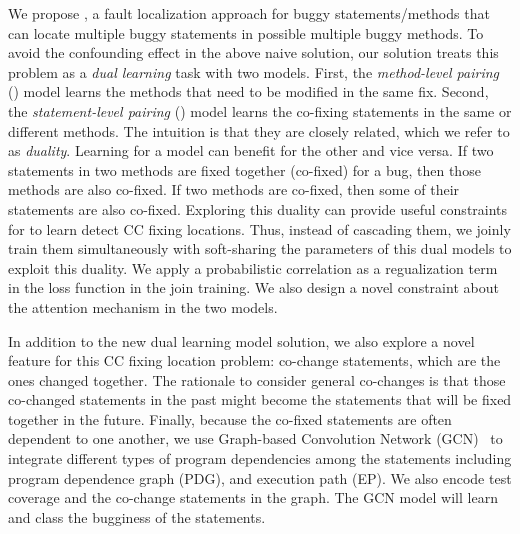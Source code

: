 We propose {\tool}, a fault localization approach for buggy
statements/methods that can locate multiple buggy statements in
possible multiple buggy methods. To avoid the confounding effect in
the above naive solution, our solution treats this problem as a {\em
  dual learning} task with two models. First, the {\em method-level
  pairing} () model learns the methods that need to be
modified in the same fix. Second, the {\em statement-level pairing}
() model learns the co-fixing statements in the same or
different methods. The intuition is that they are closely related,
which we refer to as {\em duality}. Learning for a model can benefit
for the other and vice versa. If two statements in two methods are
fixed together (co-fixed) for a bug, then those methods are also
co-fixed. If two methods are co-fixed, then some of their statements
are also co-fixed. Exploring this duality can provide useful
constraints for {\tool} to learn detect CC fixing locations. Thus,
instead of cascading them, we joinly train them simultaneously with
soft-sharing the parameters of this dual models to exploit this
duality. We apply a probabilistic correlation as a regualization term
in the loss function in the join training. We also design a novel
constraint about the attention mechanism in the two models.

In addition to the new dual learning model solution, we also explore a
novel feature for this CC fixing location problem: co-change
statements, which are the ones changed together. The rationale to
consider general co-changes is that those co-changed statements in the
past might become the statements that will be fixed together in the
future. Finally, because the co-fixed statements are often dependent
to one another, we use Graph-based Convolution Network
(GCN)~\cite{li2019gcn} to integrate different types of program
dependencies among the statements including program dependence graph
(PDG), and execution path (EP). We also encode test coverage and the
co-change statements in the graph. The GCN model will learn and class
the bugginess of the statements.


